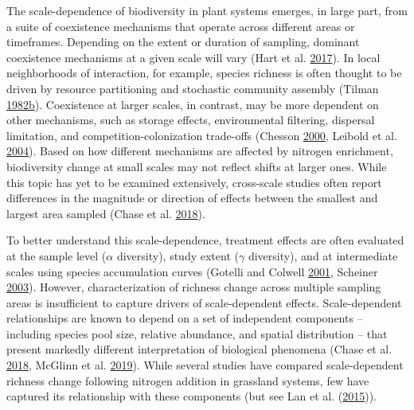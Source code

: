 \documentclass[twoside,12pt,final]{ucthesis-CA2012}
\begin{document}
\begin{ucmainmatter}
The scale-dependence of biodiversity in plant systems emerges, in large part, from a suite of coexistence mechanisms that operate across different areas or timeframes. Depending on the extent or duration of sampling, dominant coexistence mechanisms at a given scale will vary (Hart et al. \protect\hyperlink{ref-hart2017}{2017}). In local neighborhoods of interaction, for example, species richness is often thought to be driven by resource partitioning and stochastic community assembly (Tilman \protect\hyperlink{ref-Tilman1982}{1982}\protect\hyperlink{ref-Tilman1982}{b}). Coexistence at larger scales, in contrast, may be more dependent on other mechanisms, such as storage effects, environmental filtering, dispersal limitation, and competition-colonization trade-offs (Chesson \protect\hyperlink{ref-Chesson2000}{2000}, Leibold et al. \protect\hyperlink{ref-leibold2004}{2004}). Based on how different mechanisms are affected by nitrogen enrichment, biodiversity change at small scales may not reflect shifts at larger ones. While this topic has yet to be examined extensively, cross-scale studies often report differences in the magnitude or direction of effects between the smallest and largest area sampled (Chase et al. \protect\hyperlink{ref-chase2018}{2018}).

To better understand this scale-dependence, treatment effects are often evaluated at the sample level (\(\alpha\) diversity), study extent (\(\gamma\) diversity), and at intermediate scales using species accumulation curves (Gotelli and Colwell \protect\hyperlink{ref-gotelli2001}{2001}, Scheiner \protect\hyperlink{ref-scheiner2003}{2003}). However, characterization of richness change across multiple sampling areas is insufficient to capture drivers of scale-dependent effects. Scale-dependent relationships are known to depend on a set of independent components -- including species pool size, relative abundance, and spatial distribution -- that present markedly different interpretation of biological phenomena (Chase et al. \protect\hyperlink{ref-chase2018}{2018}, McGlinn et al. \protect\hyperlink{ref-mcglinn2019}{2019}). While several studies have compared scale-dependent richness change following nitrogen addition in grassland systems, few have captured its relationship with these components (but see Lan et al. (\protect\hyperlink{ref-lan2015}{2015})).


\end{ucmainmatter}
\end{document}
